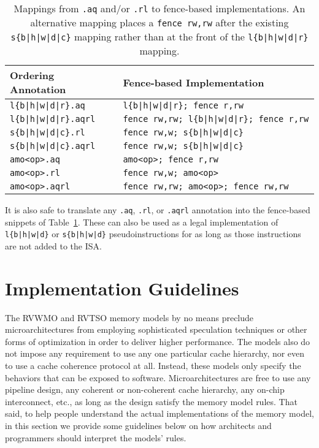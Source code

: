 \begin{table}[h!]
\centering
  \begin{tabular}{|l|l|}
    \hline
    Ordering Annotation & Fence-based Implementation \\
    \hline
    \tt l\{b|h|w|d|r\}.aq        & \tt l\{b|h|w|d|r\}; fence r,rw \\
    \hline
    \tt l\{b|h|w|d|r\}.aqrl      & \tt fence rw,rw; l\{b|h|w|d|r\}; fence r,rw \\
    \hline
    \tt s\{b|h|w|d|c\}.rl        & \tt fence rw,w; s\{b|h|w|d|c\} \\
    \hline
    \tt s\{b|h|w|d|c\}.aqrl      & \tt fence rw,w; s\{b|h|w|d|c\} \\
    \hline
    \tt amo<op>.aq               & \tt amo<op>; fence r,rw \\
    \hline
    \tt amo<op>.rl               & \tt fence rw,w; amo<op> \\
    \hline
    \tt amo<op>.aqrl             & \tt fence rw,rw; amo<op>; fence rw,rw \\
    \hline
  \end{tabular}
  \caption{Mappings from {\tt .aq} and/or {\tt .rl} to fence-based implementations.  An alternative mapping places a {\tt fence rw,rw} after the existing {\tt s\{b|h|w|d|c\}} mapping rather than at the front of the {\tt l\{b|h|w|d|r\}} mapping.}
  \label{tab:aqrltofence}
\end{table}

It is also safe to translate any {\tt .aq}, {\tt .rl}, or {\tt .aqrl} annotation into the fence-based snippets of Table~\ref{tab:aqrltofence}.
These can also be used as a legal implementation of {\tt l\{b|h|w|d\}} or {\tt s\{b|h|w|d\}} pseudoinstructions for as long as those instructions are not added to the ISA.

\section{Implementation Guidelines}

The RVWMO and RVTSO memory models by no means preclude microarchitectures from employing sophisticated speculation techniques or other forms of optimization in order to deliver higher performance.
The models also do not impose any requirement to use any one particular cache hierarchy, nor even to use a cache coherence protocol at all.
Instead, these models only specify the behaviors that can be exposed to software.
Microarchitectures are free to use any pipeline design, any coherent or non-coherent cache hierarchy, any on-chip interconnect, etc., as long as the design satisfy the memory model rules.
That said, to help people understand the actual implementations of the memory model, in this section we provide some guidelines below on how architects and programmers should interpret the models' rules.

